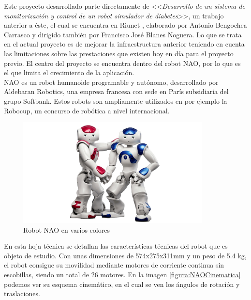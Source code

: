 \documentclass[12pt,spanish,listoffigures,listoftables]{tfgetsinf}
\begin{document}
Este proyecto desarrollado parte directamente de <<\textit{Desarrollo de un sistema de monitorización y control de un robot simulador de diabetes}>>, un trabajo anterior a éste, el cual se encuentra en Riunet \cite{TFMAnterior}, elaborado por Antonio Bengochea Carrasco y dirigido también por Francisco José Blanes Noguera. Lo que se trata en el actual proyecto es de mejorar la infraestructura anterior teniendo en cuenta las limitaciones sobre las prestaciones que existen hoy en día para el proyecto previo. El centro del proyecto se encuentra dentro del robot NAO, por lo que es el que limita el crecimiento de la aplicación. \\

NAO es un robot humanoide programable y autónomo, desarrollado por Aldebaran Robotics, una empresa francesa con sede en París subsidiaria del grupo Softbank. Estos robots son ampliamente utilizados en por ejemplo la Robocup, un concurso de robótica a nivel internacional. \\

\begin{figure}[!h]
	\centering
	\includegraphics[height=5.5cm]{img/NAOIlustracion}
	\caption{Robot NAO en varios colores}
	\label{figura:NAOIlustracion}
\end{figure}

En esta hoja técnica \cite{NAOdatasheet} se detallan las características técnicas del robot que es objeto de estudio. Con unas dimensiones de 574x275x311mm y un peso de 5.4 kg, el robot consigue su movilidad mediante motores de corriente continua sin escobillas, siendo un total de 26 motores. En la imagen \ref{figura:NAOCinematica} podemos ver su esquema cinemático, en el cual se ven los ángulos de rotación y traslaciones. \\
\end{document}
